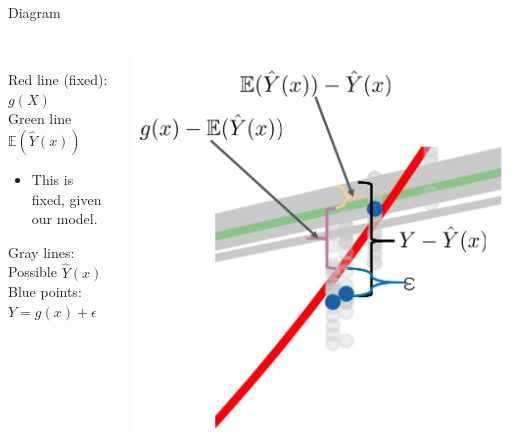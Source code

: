 \documentclass[aspectratio=169]{../latex_main/tntbeamer}  %
\begin{document}
	\begin{frame}[c]{Diagram}
	  \begin{columns}
	     
	      
	      \begin{column}{.4\textwidth}
	      \\
	      \bigskip
	      \bigskip
	      \bigskip
	          Red line (fixed): $g(X)$\\
	          Green line $\mathbb{E}(\widehat{Y}(x))$
	          \begin{itemize}
	              \item This is fixed, given our model.
	          \end{itemize}
	          Gray lines: Possible $\widehat{Y}(x)$\\
	          Blue points: $Y = g(x) + \epsilon$
	      \end{column}
	      
	       \begin{column}{.6\textwidth}
	       
	               \includegraphics[scale=.3]{Bild13}
	               
	      \end{column}
	  \end{columns}
	\end{frame}
\end{document}
